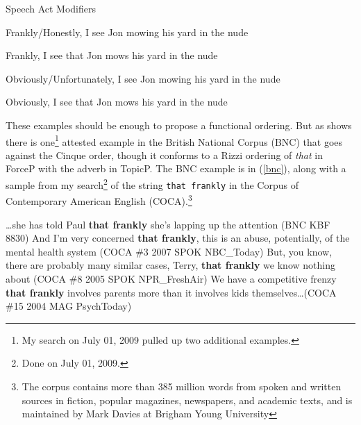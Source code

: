\documentclass{article}
\begin{document}
\begin{exe}
\ex Speech Act Modifiers\label{samod}
\begin{xlist}
\ex Frankly/Honestly, I see Jon mowing his yard in the nude
\begin{xlist}
\ex Frankly, I see that Jon mows his yard in the nude

\end{xlist}
\ex Obviously/Unfortunately, I see Jon mowing his yard in the nude
\begin{xlist}
\ex Obviously, I see that Jon mows his yard in the nude
\end{xlist}
\end{xlist}
\end{exe}

  These examples should be enough to propose a functional ordering. But as \cite{vangelderen05cpsplit} shows there is one\footnote{My search on July 01, 2009 pulled up two additional examples.} attested example in the British National Corpus (BNC) that goes against the Cinque order, though it conforms to a Rizzi ordering of {\sl that} in ForceP with the adverb in TopicP. The BNC example is in (\ref{bnc}), along with a sample from my search\footnote{Done on July 01, 2009.} of the string \texttt{that frankly} in the Corpus of Contemporary American English (COCA).\footnote{The corpus contains more than 385 million words from spoken and written sources in fiction, popular magazines, newspapers, and academic texts, and is maintained by Mark Davies at Brigham Young University}
  
\begin{exe}
\ex \ldots she has told Paul {\bf that frankly} she's lapping up the attention (BNC KBF 8830)\label{bnc}
\ex And I'm very concerned {\bf that frankly}, this is an abuse, potentially, of the mental health system (COCA \#3 2007 SPOK NBC\_Today)
\ex But, you know, there are probably many similar cases, Terry, {\bf that frankly} we know nothing about (COCA \#8 2005 SPOK NPR\_FreshAir)
\ex We have a competitive frenzy {\bf that frankly} involves parents more than it involves kids themselves\ldots (COCA \#15 2004 MAG PsychToday)
\end{exe}
\end{document}
